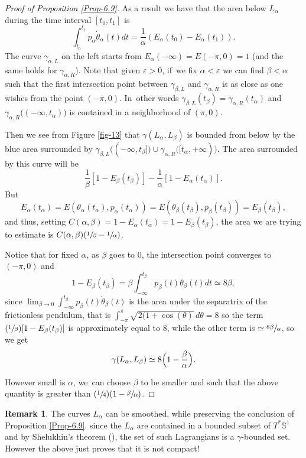 \documentclass[JEP,XML,SOM,Unicode,NoFloatCountersInSection,published]{cedram}
\newcommand{\Psfrac}[2]{(\sfrac{#1}{#2})}
\theoremstyle{definition}
\newtheorem{rem}[thm]{Remark}
\newcommand{\bS}{\mathbb{S}}
\begin{document}
\begin{proof}[Proof of Proposition \ref{Prop-6.9}]
As a result we have that the area below $L_\alpha$ during the time interval $[t_0,t_1]$ is
\[
\int_{t_0}^{t_1} p_\alpha \dot \theta_\alpha(t) dt= \frac{1}{\alpha}(E_\alpha(t_0)-E_\alpha(t_1)).
\]
The curve $\gamma_{\alpha,L}$ on the left starts from $E_\alpha(-\infty)=E(-\pi,0)=1$ (and the same holds for $\gamma_{\alpha,R}$).
Note that given $ \varepsilon >0$, if~we fix $\alpha< \varepsilon $ we can find $\beta <\alpha $ such that the first intersection point between
$\gamma_{\beta,L}$ and $\gamma_{\alpha,R}$ is as close as one wishes from the point $(-\pi,0)$. In~other words $\gamma_{\beta,L}(t_\beta)=\gamma_{\alpha,R}(t_\alpha)$ and
$\gamma_{\alpha,R}\bigl((-\infty, t_\alpha)\bigr)$ is contained in a neighborhood of $(\pi,0)$.

Then we see from Figure \ref{fig-13} that $\gamma(L_\alpha, L_\beta)$ is bounded from below by the blue area surrounded by
$\gamma_{\beta,L}\bigl((-\infty, t_\beta]\bigr)\cup \gamma_{\alpha,R}\bigl([t_\alpha, +\infty)\bigr)$. The area surrounded by this curve will be
\[
\frac{1}{\beta}[1-E_\beta(t_\beta)]-\frac{1}{\alpha}[1-E_\alpha(t_\alpha)].
\]
But
\[
E_\alpha(t_\alpha)=E(\theta_\alpha(t_\alpha),p_\alpha(t_\alpha))=E(\theta_\beta(t_\beta),p_\beta(t_\beta))=E_\beta(t_\beta),
\]
and
thus, setting $C(\alpha,\beta)=1-E_\alpha(t_\alpha)=1-E_\beta(t_\beta)$,
the area we are trying to estimate is $C(\alpha, \beta) (\sfrac{1}{\beta}- \sfrac{1}{\alpha})$.

Notice that for fixed $\alpha$, as $\beta $ goes to $0$, the intersection point converges to $(-\pi,0)$ and
\[
1-E_\beta(t_\beta)=\beta\int_{-\infty}^{t_\beta}p_\beta(t)\dot \theta_\beta(t)dt\simeq 8\beta,
\]
since $\lim_{\beta\to 0}\int_{-\infty}^{t_\beta}p_\beta(t)\dot \theta_\beta(t)$ is the area under the separatrix of the frictionless pendulum, that is $\int_{-\pi}^\pi \sqrt{2(1+\cos(\theta)}\,d\theta =8$
so the term $\Psfrac{1}{\beta}[1-E_\beta(t_\beta)]$ is approximately equal to $8$, while the other term is $\simeq \sfrac{8\beta}{\alpha}$, so we get
\[
\gamma(L_\alpha, L_\beta)\simeq 8\Bigl(1- \frac{\beta}{\alpha}\Bigr).
\]

However small is $\alpha$, we~can choose $\beta$ to be smaller and such that the above quantity is greater than $\Psfrac14(1-\sfrac\beta\alpha)$.
\end{proof}

\begin{rem}
The curves $L_\alpha$ can be smoothed, while preserving the conclusion of Proposition \ref{Prop-6.9}. since the $L_\alpha$ are contained in a bounded subset of $T^*\bS^1$ and by Shelukhin's theorem (\cite{Shelukhin-Zoll}), the set of such Lagrangians is a $\gamma$\nobreakdash-bounded set. However the above just proves that it is not compact!
\end{rem}
\end{document}
